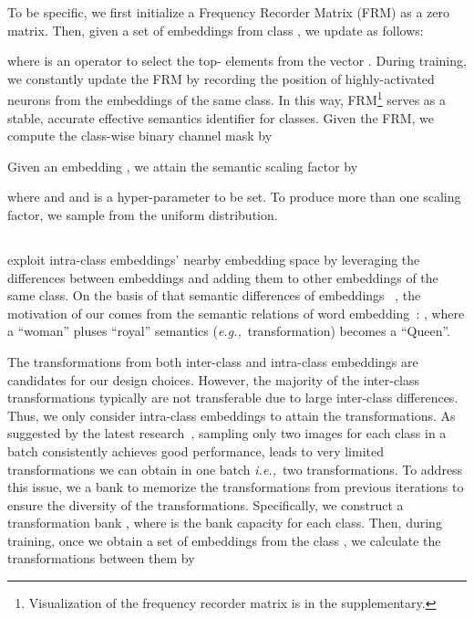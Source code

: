 \documentclass[runningheads]{llncs}
\def\eg{\emph{e.g.,}} \def\Eg{\emph{E.g.}}
\def\ie{\emph{i.e.,}} \def\Ie{\emph{I.e.}}
\begin{document}
To be specific, we first initialize a Frequency Recorder Matrix (FRM)  as a zero matrix. Then, given a set of embeddings  from class , we update  as follows:

where  is an operator to select the top- elements from the vector . During training, we constantly update the FRM by recording the position of highly-activated neurons from the embeddings of the same class. In this way, FRM\footnote{Visualization of the frequency recorder matrix is in the supplementary.} serves as a stable, accurate  effective semantics identifier for  classes. Given the FRM, we compute the
class-wise binary channel mask  by

Given an embedding , we attain the semantic scaling factor by

where  and  and  is a hyper-parameter to be set.  To produce more than one scaling factor, we  sample  from the uniform distribution. 

\subsection{\tmb}
\label{sec:tmb}



exploit intra-class embeddings' nearby embedding space by leveraging the differences between embeddings and adding them to other embeddings of the same class. On the basis of that semantic differences of embeddings ~\cite{lin2018deep}, the motivation of our \shorttmb comes from the semantic relations of word embedding~\cite{mikolov2013linguistic}: \crrevision{\textit{}}, where a ``woman'' pluses ``royal'' semantics (\eg~transformation) becomes a ``Queen''.


The transformations from both inter-class and intra-class embeddings are candidates for our design choices. However, 
the majority of the inter-class transformations typically are not transferable due to large inter-class differences. Thus, we only consider intra-class embeddings to attain the transformations. As suggested by the latest research~\cite{roth2020revisiting}, sampling only two images for each class in a batch consistently achieves good performance,  leads to very limited transformations we can obtain in one batch \ie~two transformations. To address this issue, we  a bank to memorize the transformations from previous iterations to ensure the diversity of the transformations. Specifically, we construct a transformation bank , where  is the bank capacity for each class. Then, during training, once we obtain a set of embeddings  from the class , we calculate the transformations between them by
\end{document}
